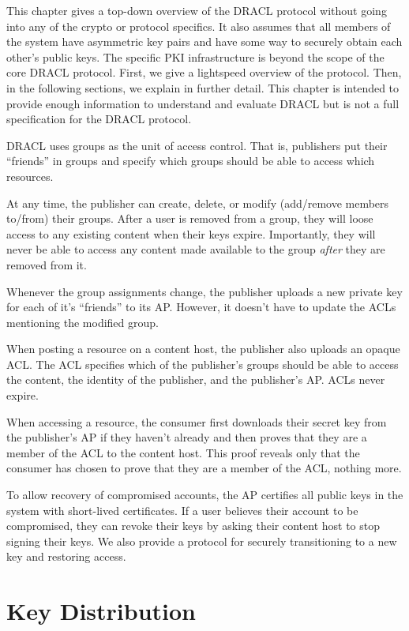\documentclass[pdftex,12pt,a4papaer]{report}
\begin{document}
This chapter gives a top-down overview of the DRACL protocol without going into
any of the crypto or protocol specifics. It also assumes that all members of the
system have asymmetric key pairs and have some way to securely obtain each
other's public keys. The specific PKI infrastructure is beyond the scope of the
core DRACL protocol. First, we give a lightspeed overview of the protocol. Then,
in the following sections, we explain in further detail. This chapter is
intended to provide enough information to understand and evaluate DRACL but is
not a full specification for the DRACL protocol.

DRACL uses groups as the unit of access control. That is, publishers put
their ``friends'' in groups and specify which groups should be able to access
which resources.

At any time, the publisher can create, delete, or modify (add/remove members
to/from) their groups. After a user is removed from a group, they will loose
access to any existing content when their keys expire. Importantly, they will
never be able to access any content made available to the group \emph{after}
they are removed from it.
  
Whenever the group assignments change, the publisher uploads a new private
key for each of it's ``friends'' to its AP. However, it doesn't have to update
the ACLs mentioning the modified group.
  
When posting a resource on a content host, the publisher also uploads an
opaque ACL. The ACL specifies which of the publisher's groups should be able
to access the content, the identity of the publisher, and the publisher's AP. ACLs never expire.
  
When accessing a resource, the consumer first downloads their secret key from
the publisher's AP if they haven't already and then proves that they are a
member of the ACL to the content host. This proof reveals only that the consumer
has chosen to prove that they are a member of the ACL, nothing more.
  
To allow recovery of compromised accounts, the AP certifies all public keys in
the system with short-lived certificates. If a user believes their account to be
compromised, they can revoke their keys by asking their content host to stop
signing their keys. We also provide a protocol for securely transitioning to a
new key and restoring access.

\section{Key Distribution}
\end{document}
